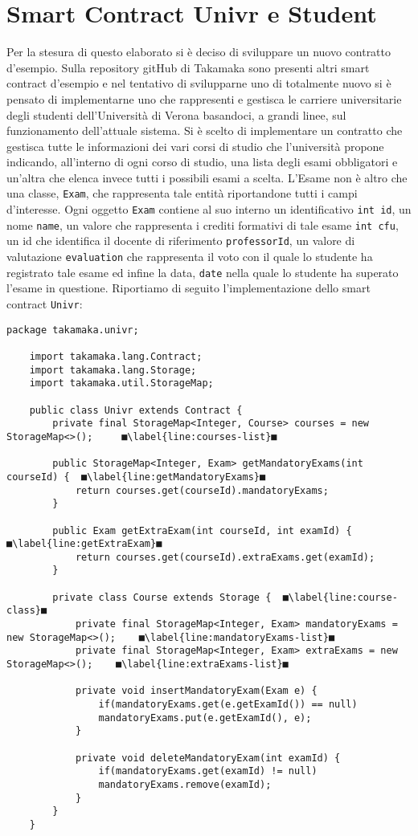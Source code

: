 \section{Smart Contract Univr e Student}
Per la stesura di questo elaborato si è deciso di sviluppare un nuovo contratto d'esempio. Sulla repository gitHub di Takamaka sono presenti altri smart contract d'esempio e nel tentativo di svilupparne uno di totalmente nuovo si è pensato di implementarne uno che rappresenti e gestisca le carriere universitarie degli studenti dell'Università di Verona basandoci, a grandi linee, sul funzionamento dell'attuale sistema. Si è scelto di implementare un contratto che gestisca tutte le informazioni dei vari corsi di studio che l'università propone indicando, all'interno di ogni corso di studio, una lista degli esami obbligatori e un'altra che elenca invece tutti i possibili esami a scelta. L'Esame non è altro che una classe, \lstinline|Exam|, che rappresenta tale entità riportandone tutti i campi d'interesse. Ogni oggetto \lstinline|Exam| contiene al suo interno un identificativo \lstinline|int id|, un nome \lstinline|name|, un valore che rappresenta i crediti formativi di tale esame \lstinline|int cfu|, un id che identifica il docente di riferimento \lstinline|professorId|, un valore di valutazione \lstinline|evaluation| che rappresenta il voto con il quale lo studente ha registrato tale esame ed infine la data, \lstinline|date| nella quale lo studente ha superato l'esame in questione. Riportiamo di seguito l'implementazione dello smart contract \lstinline|Univr|:
%
\begin{lstlisting}[breaklines=true]
	package takamaka.univr;
	
	import takamaka.lang.Contract;
	import takamaka.lang.Storage;
	import takamaka.util.StorageMap;
	
	public class Univr extends Contract {
		private final StorageMap<Integer, Course> courses = new StorageMap<>();		■\label{line:courses-list}■
		
		public StorageMap<Integer, Exam> getMandatoryExams(int courseId) {	■\label{line:getMandatoryExams}■
			return courses.get(courseId).mandatoryExams;
		}
		
		public Exam getExtraExam(int courseId, int examId) {	■\label{line:getExtraExam}■ 
			return courses.get(courseId).extraExams.get(examId);
		}
		
		private class Course extends Storage {	■\label{line:course-class}■
			private final StorageMap<Integer, Exam> mandatoryExams = new StorageMap<>();	■\label{line:mandatoryExams-list}■
			private final StorageMap<Integer, Exam> extraExams = new StorageMap<>();	■\label{line:extraExams-list}■
			
			private void insertMandatoryExam(Exam e) {
				if(mandatoryExams.get(e.getExamId()) == null)
				mandatoryExams.put(e.getExamId(), e);
			}
			
			private void deleteMandatoryExam(int examId) {
				if(mandatoryExams.get(examId) != null)
				mandatoryExams.remove(examId);
			}
		}
	}
\end{lstlisting}
